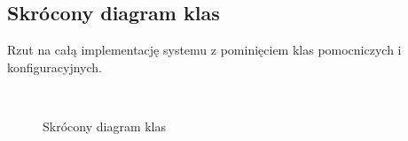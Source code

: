 \documentclass[a4paper,11pt]{report}
\begin{document}
\subsection{Skrócony diagram klas}
Rzut na całą implementację systemu z pominięciem klas pomocniczych i konfiguracyjnych.
\begin{figure}[H]
	\centering
	\\
	\caption{Skrócony diagram klas}
	\label{fig:gamitude_backend}
\end{figure}
\end{document}
